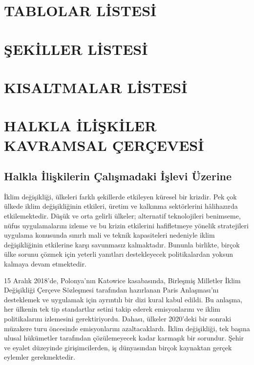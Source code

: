 \documentclass[
]{book}
\begin{document}
\hypertarget{tablolar-listesi}{%
\chapter*{TABLOLAR LİSTESİ}\label{tablolar-listesi}}

\hypertarget{ux15fekiller-listesi}{%
\chapter*{ŞEKİLLER LİSTESİ}\label{ux15fekiller-listesi}}

\hypertarget{kisaltmalar-listesi}{%
\chapter*{KISALTMALAR LİSTESİ}\label{kisaltmalar-listesi}}

\hypertarget{intro}{%
\chapter{HALKLA İLİŞKİLER KAVRAMSAL ÇERÇEVESİ}\label{intro}}

\hypertarget{halkla-iliux15fkilerin-uxe7alux131ux15fmadaki-iux15flevi-uxfczerine}{%
\section{Halkla İlişkilerin Çalışmadaki İşlevi Üzerine}\label{halkla-iliux15fkilerin-uxe7alux131ux15fmadaki-iux15flevi-uxfczerine}}

İklim değişikliği, ülkeleri farklı şekillerde etkileyen küresel bir krizdir. Pek çok ülkede iklim değişikliğinin etkileri, üretim ve kalkınma sektörlerini hâlihazırda etkilemektedir. Düşük ve orta gelirli ülkeler; alternatif teknolojileri benimseme, nüfus uygulamalarını izleme ve bu krizin etkilerini hafifletmeye yönelik stratejileri uygulama konusunda sınırlı mali ve teknik kapasiteleri nedeniyle iklim değişikliğinin etkilerine karşı savunmasız kalmaktadır. Bununla birlikte, birçok ülke sorunu çözmek için yeterli yanıtları destekleyecek politikalardan yoksun kalmaya devam etmektedir. \citep{glasgow2018public}

15 Aralık 2018'de, Polonya'nın Katowice kasabasında, Birleşmiş Milletler İklim Değişikliği Çerçeve Sözleşmesi tarafından hazırlanan Paris Anlaşması'nı desteklemek ve uygulamak için ayrıntılı bir dizi kural kabul edildi. Bu anlaşma, her ülkenin tek tip standartlar setini takip ederek emisyonlarını ve iklim politikalarını izlemesini gerektiriyordu. Dahası, ülkeler 2020'deki bir sonraki müzakere turu öncesinde emisyonlarını azaltacaklardı. İklim değişikliği, tek başına ulusal hükümetler tarafından çözülemeyecek kadar karmaşık bir sorundur. Şehir ve eyalet düzeyinde girişimcilerden, iş dünyasından birçok kaynaktan gerçek eylemler gerekmektedir. \citep{dhanda2019climate}
\end{document}
